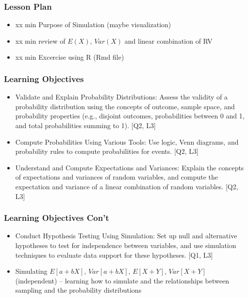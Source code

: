 

\begin{frame}
\frametitle{Lesson Plan}
\begin{itemize}
    \item xx min Purpose of Simulation (maybe visualization)
    \item xx min review of $E(X)$, $Var(X)$ and linear combination of RV
    \item xx min Excercise using R (Rmd file)
\end{itemize}
\end{frame}


\begin{frame}
\frametitle{Learning Objectives}

\begin{itemize}
    \item Validate and Explain Probability Distributions: Assess the validity of a probability distribution using the concepts of outcome, sample space, and probability properties (e.g., disjoint outcomes, probabilities between 0 and 1, and total probabilities summing to 1). [Q2, L3] 
    \item Compute Probabilities Using Various Tools: Use logic, Venn diagrams, and probability rules to compute probabilities for events. [Q2, L3] 
    \item Understand and Compute Expectations and Variances: Explain the concepts of expectations and variances of random variables, and compute the expectation and variance of a linear combination of random variables. [Q2, L3] 
\end{itemize}
\end{frame}


\begin{frame}
    \frametitle{Learning Objectives Con't}

    \begin{itemize}
        \item Conduct Hypothesis Testing Using Simulation: Set up null and alternative hypotheses to test for independence between variables, and use simulation techniques to evaluate data support for these hypotheses. [Q1, L3]
        \item Simulating $E[a+bX]$, $Var[a+bX]$, $E[X+Y]$, $Var[X+Y]$ (independent) -- learning how to simulate and the relationships between sampling and the probability distributions

    \end{itemize}
\end{frame}






